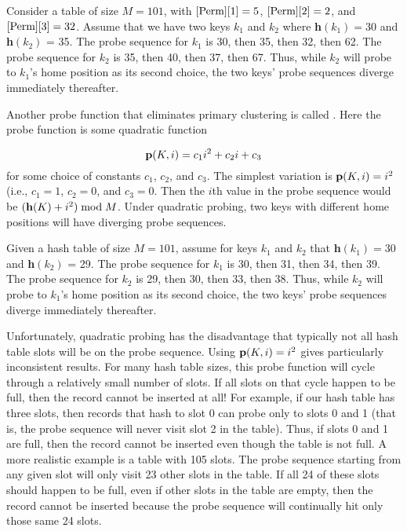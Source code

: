 \begin{example}
Consider a table of size \(M = 101\), with \(\Cref{Perm}[1] = 5\),
 \(\Cref{Perm}[2] = 2\), and \(\Cref{Perm}[3] = 32\).
Assume that we have two keys \(k_1\) and \(k_2\) where
{\bf h}\((k_1) = 30\) and {\bf h}\((k_2)\) = 35.
The probe sequence for \(k_1\) is 30, then 35, then 32, then 62.
The probe sequence for \(k_2\) is 35, then 40, then 37, then 67.
Thus, while \(k_2\) will probe to \(k_1\)'s home position as its second
choice, the two keys' probe sequences diverge immediately thereafter.
\end{example}

Another probe function that eliminates
primary clustering is called
 .
Here the probe function is some
quadratic function

\vspace{-\medskipamount}
\vspace{-\smallskipamount}
\[ {\bf p}(K, i) = c_1 i^2 + c_2 i + c_3\]
\noindent for some choice of constants \(c_1\), \(c_2\), and
\(c_3\).
The simplest variation is \({\bf p}(K, i) = i^2\)
(i.e., \(c_1=1\), \(c_2=0\), and \(c_3=0\).
Then the \(i\)th value in the probe sequence would be
\(({\bf h}(K) + i^2) \bmod M\).
Under quadratic probing, two keys with different home
positions will have diverging probe sequences.

\begin{example}
Given a hash table of size \(M = 101\), assume
for keys \(k_1\) and \(k_2\) that {\bf h}\((k_1) = 30\)
and {\bf h}\((k_2)\) = 29.
The probe sequence for \(k_1\) is 30, then 31, then 34, then 39.
The probe sequence for \(k_2\) is 29, then 30, then 33, then 38.
Thus, while \(k_2\) will probe to \(k_1\)'s home position as its second
choice, the two keys' probe sequences diverge immediately thereafter.
\end{example}

Unfortunately, quadratic probing has the disadvantage that typically
not all hash table slots will be on the probe sequence.
Using \({\bf p}(K, i) = i^2\) gives particularly inconsistent results.
For many hash table sizes, this probe function will cycle through a
relatively small number of slots.
If all slots on that cycle happen to be full, then the record cannot
be inserted at all!
For example, if our hash table has three slots, then records that hash
to slot 0 can probe only to slots 0 and 1 (that is, the probe sequence
will never visit slot 2 in the table).
Thus, if slots 0 and 1 are full, then the record cannot be inserted
even though the table is not full.
A more realistic example is a table with 105 slots.
The probe sequence starting from any given slot will only visit 23
other slots in the table.
If all 24 of these slots should happen to be full, even if other slots
in the table are empty, then the record cannot be inserted because the
probe sequence will continually hit only those same 24 slots.


